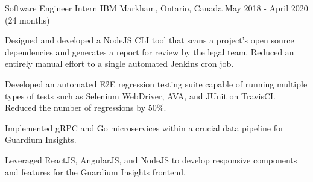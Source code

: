 \begin{cventries}
\cventry
{Software Engineer Intern} %
{IBM} %
{Markham, Ontario, Canada} %
{May 2018 - April 2020 (24 months)} %
{ %
\begin{cvitems}
\item {Designed and developed a NodeJS CLI tool that scans a project's open source dependencies and generates a report for review by the legal team. Reduced an entirely manual effort to a single automated Jenkins cron job.}
\item {Developed an automated E2E regression testing suite capable of running multiple types of tests such as Selenium WebDriver, AVA, and JUnit on TravisCI. Reduced the number of regressions by 50\%.}
\item {Implemented gRPC and Go microservices within a crucial data pipeline for Guardium Insights.}
\item {Leveraged ReactJS, AngularJS, and NodeJS to develop responsive components and features for the Guardium Insights frontend.}
\end{cvitems}
}


\end{cventries}